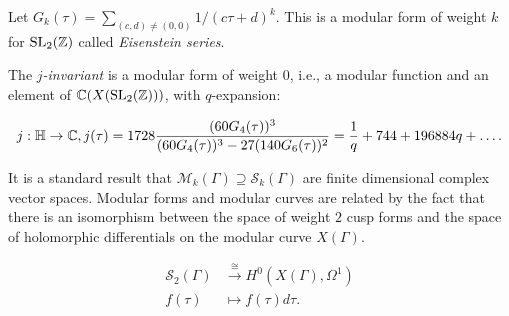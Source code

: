 \begin{example}
Let $G_k(\tau) = \sum_{(c,d) \not = (0,0)} 1/(c\tau + d)^k$. This is a modular form of weight $k$ for $\operatorname{SL}_2(\mathbb{Z})$ called \textit{Eisenstein series}. 

    The \textit{$j$-invariant} is a modular form of weight $0$, i.e., a modular function and an element of $\mathbb{C}(X(\operatorname{SL}_2(\mathbb{Z})))$, with $q$-expansion:

    \begin{align*}
        j: \mathbb{H} \rightarrow \mathbb{C}, j(\tau) = 1728 \frac{(60 G_4(\tau))^3}{(60 G_4(\tau))^3 - 27 (140 G_6(\tau))^2} = \frac{1}{q} + 744 + 196884q + \ldots.
    \end{align*}
\end{example}

It is a standard result that $\mathcal{M}_k(\Gamma) \supseteq \mathcal{S}_k(\Gamma)$ are finite dimensional complex vector spaces. Modular forms and modular curves are related by the fact that there is an isomorphism between the space of weight $2$ cusp forms and the space of holomorphic differentials on the modular curve $X(\Gamma)$. 

\begin{align*}
\mathcal{S}_2(\Gamma) &\xrightarrow{\cong} H^0(X(\Gamma),\Omega^1) \\
f(\tau) &\mapsto f(\tau) d\tau.
\end{align*}